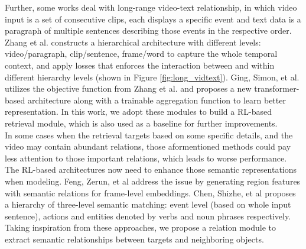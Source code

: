 Further, some works deal with long-range video-text relationship, in which video input is a set of consecutive clips, each displays a specific event and text data is a paragraph of multiple sentences describing those events in the respective order. 
Zhang et al. \cite{zhang2018cross} constructs a hierarchical architecture with different levels: video/paragraph, clip/sentence, frame/word to capture the whole temporal context, and apply losses that enforces the interaction between and within different hierarchy levels (shown in Figure \ref{fig:long_vidtext}). Ging, Simon, et al. \cite{ging2020coot} utilizes the objective function from Zhang et al. \cite{zhang2018cross} and proposes a new transformer-based architecture along with a trainable aggregation function to learn better representation. In this work, we adopt these modules to build a RL-based retrieval module, which is also used as a baseline for further improvements.\\
In some cases when the retrieval targets based on some specific details, and the video may contain abundant relations, those aformentioned methods could pay less attention to those important relations, which leads to worse performance. The RL-based architectures now need to enhance those semantic representations when modeling. Feng, Zerun, et al \cite{feng2020exploiting} address the issue by generating region features with semantic relations for frame-level embeddings. Chen, Shizhe, et al \cite{chen2020fine} proposes a hierarchy of three-level semantic matching: event level (based on whole input sentence), actions and entities denoted by verbs and noun phrases respectively. Taking inspiration from these approaches, we propose a relation module to extract semantic relationships between targets and neighboring objects.

